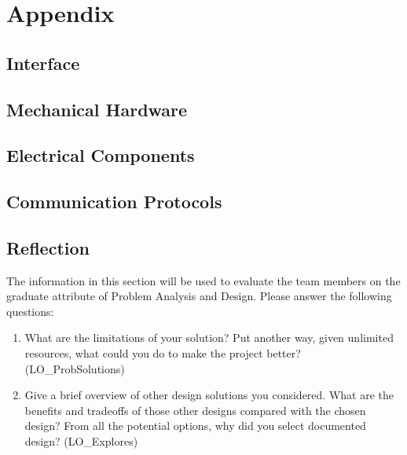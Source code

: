 \documentclass[12pt, titlepage]{article}
\begin{document}

% 

\newpage{}
\section{Appendix}

\subsection{Interface}


\subsection{Mechanical Hardware}

\subsection{Electrical Components}

\subsection{Communication Protocols}

\subsection{Reflection}

The information in this section will be used to evaluate the team members on the
graduate attribute of Problem Analysis and Design.  Please answer the following questions:

\begin{enumerate}
  \item What are the limitations of your solution?  Put another way, given
  unlimited resources, what could you do to make the project better? (LO\_ProbSolutions)
  \item Give a brief overview of other design solutions you considered.  What
  are the benefits and tradeoffs of those other designs compared with the chosen
  design?  From all the potential options, why did you select documented design?
  (LO\_Explores)
\end{enumerate}
\end{document}
